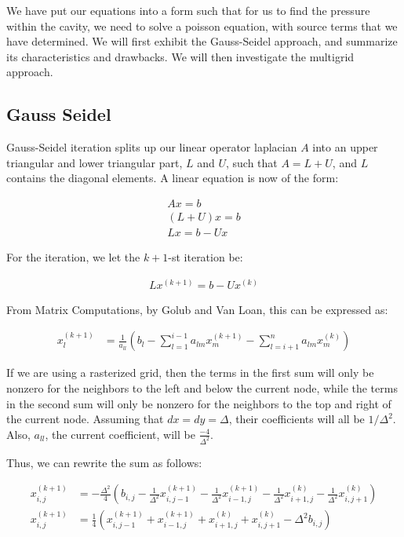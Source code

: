 \documentclass[11pt]{article}
\begin{document}
We have put our equations into a form such that for us to find the pressure
	within the cavity, we need to solve a poisson equation,
	with source terms that we have determined.
We will first exhibit the Gauss-Seidel approach, and summarize its characteristics
	and drawbacks.
We will then investigate the multigrid approach.

\subsection{Gauss Seidel}

Gauss-Seidel iteration splits up our linear operator laplacian $A$ into
	an upper triangular and lower triangular part, $L$ and $U$,
	such that $A = L + U$, and $L$ contains the diagonal elements.
A linear equation is now of the form:

\begin{align}
A x = b \\
(L + U) x = b\\
L x = b - U x
\end{align}

For the iteration, we let the $k+1$-st iteration be:

\begin{align}
L x^{(k+1)} = b - U x^{(k)}
\end{align}

From Matrix Computations, by Golub and Van Loan, this can be expressed as:

\begin{align}
x_l^{(k+1)} & = \frac{1}{a_{ll}} \left( b_l 
	- \sum_{l=1}^{i-1} a_{lm} x_m^{(k+1)}
	- \sum_{l=i+1}^n a_{lm} x_m^{(k)} \right)
\end{align}

If we are using a rasterized grid, then the terms in the first
	sum will only be nonzero for the neighbors to the left
	and below the current node,
	while the terms in the second sum will only be nonzero for
	the neighbors to the top and right of the current node.
Assuming that $dx = dy = \Delta$, their coefficients will all be $1/\Delta^2$.
Also, $a_{ll}$, the current coefficient, will be $\frac{-4}{\Delta^2}$.

Thus, we can rewrite the sum as follows:

\begin{align}
x_{i,j}^{(k+1)} & = - \frac{\Delta^2}{4} \left( b_{i,j} 
	- \frac{1}{\Delta^2} x_{i,j-1}^{(k+1)}
	- \frac{1}{\Delta^2} x_{i-1,j}^{(k+1)}
	- \frac{1}{\Delta^2} x_{i+1,j}^{(k)}
	- \frac{1}{\Delta^2} x_{i,j+1}^{(k)} \right)\\
x_{i,j}^{(k+1)} & = \frac{1}{4} \left(
	x_{i,j-1}^{(k+1)}
	+ x_{i-1,j}^{(k+1)}
	+ x_{i+1,j}^{(k)}
	+ x_{i,j+1}^{(k)}
	- \Delta^2 b_{i,j} \right)
\end{align}
\end{document}
